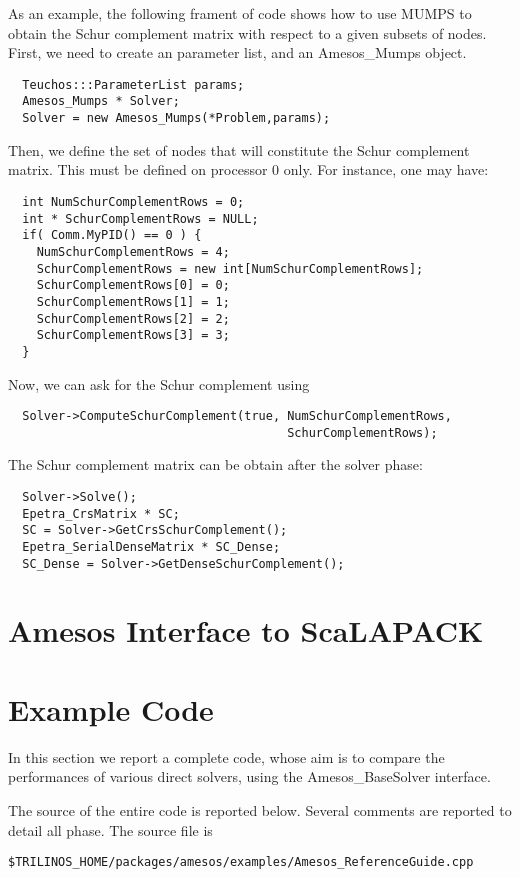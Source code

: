 \documentclass[11pt,letter]{article}
\begin{document}
\medskip


As an example, the following frament of code shows how to use MUMPS to
obtain the Schur complement matrix with respect to a given subsets of
nodes.  First, we need to create an parameter list, and an Amesos\_Mumps
object.
\begin{verbatim}
  Teuchos:::ParameterList params;
  Amesos_Mumps * Solver;
  Solver = new Amesos_Mumps(*Problem,params);
\end{verbatim}
Then, we define the set of nodes that will constitute the Schur
complement matrix. This must be defined on processor 0 only. For
instance, one may have:
\begin{verbatim}
  int NumSchurComplementRows = 0;
  int * SchurComplementRows = NULL;
  if( Comm.MyPID() == 0 ) {
    NumSchurComplementRows = 4;
    SchurComplementRows = new int[NumSchurComplementRows];
    SchurComplementRows[0] = 0;
    SchurComplementRows[1] = 1; 
    SchurComplementRows[2] = 2;
    SchurComplementRows[3] = 3;
  }
\end{verbatim}
Now, we can ask for the Schur complement using
\begin{verbatim}  
  Solver->ComputeSchurComplement(true, NumSchurComplementRows,
                                       SchurComplementRows);
\end{verbatim}
The Schur complement matrix can be obtain after the solver phase:  
\begin{verbatim}  
  Solver->Solve();
  Epetra_CrsMatrix * SC;
  SC = Solver->GetCrsSchurComplement();
  Epetra_SerialDenseMatrix * SC_Dense;
  SC_Dense = Solver->GetDenseSchurComplement();
\end{verbatim}


\section{Amesos Interface to ScaLAPACK}
\label{sec:scalapack}


\section{Example Code}
\label{sec:comparison}

In this section we report a complete code, whose aim is to compare the
performances of various direct solvers, using the Amesos\_BaseSolver
interface. 

The source of the entire code is reported below. Several comments are
reported to detail all phase. The source file is
\begin{verbatim}
$TRILINOS_HOME/packages/amesos/examples/Amesos_ReferenceGuide.cpp
\end{verbatim}
\end{document}
